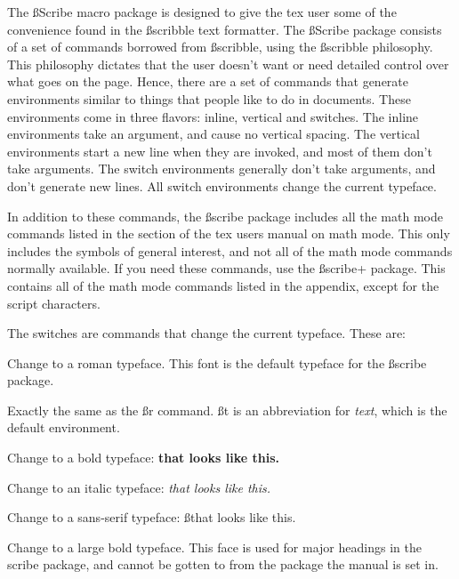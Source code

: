 
The {\ss Scribe} macro package is designed to give the tex user
some of the convenience found in the {\ss scribble} text
formatter. The {\ss Scribe} package consists of a set of commands
borrowed from {\ss scribble}, using the {\ss scribble}
philosophy. This philosophy dictates that the user doesn't want
or need detailed control over what goes on the page. Hence, there
are a set of commands that generate environments similar to
things that people like to do in documents. These environments
come in three flavors: inline, vertical and switches. The inline
environments take an argument, and cause no vertical spacing. The
vertical environments start a new line when they are invoked, and
most of them don't take arguments. The switch environments
generally don't take arguments, and don't generate new lines. All
switch environments change the current typeface.

In addition to these commands, the {\ss scribe} package includes
all the math mode commands listed in the section of the tex users
manual on math mode. This only includes the symbols of general
interest, and not all of the math mode commands normally
available. If you need these commands, use the {\ss scribe+}
package. This contains all of the math mode commands listed in
the appendix, except for the script characters.


The switches are commands that change the current typeface. These
are:

{\describe

 Change to a roman typeface. This font is the default
typeface for the {\ss scribe} package.

 Exactly the same as the {\ss r} command. {\ss t} is an
abbreviation for {\it text}, which is the default environment.

 Change to a bold typeface: {\bf that looks like this.}

 Change to an italic typeface: {\it that looks like this.}

 Change to a sans-serif typeface: {\ss that looks like this.}

 Change to a large bold typeface. This face is used for
major headings in the scribe package, and cannot be gotten to
from the package the manual is set in.
}		%


